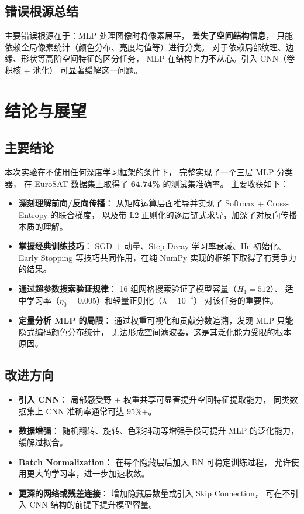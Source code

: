 \documentclass[12pt, a4paper]{article}
\begin{document}
\subsection{错误根源总结}

主要错误根源在于：MLP 处理图像时将像素展平，
\textbf{丢失了空间结构信息}，
只能依赖全局像素统计（颜色分布、亮度均值等）进行分类。
对于依赖局部纹理、边缘、形状等高阶空间特征的区分任务，
MLP 在结构上力不从心。引入 CNN（卷积核 + 池化）
可显著缓解这一问题。

\section{结论与展望}

\subsection{主要结论}

本次实验在不使用任何深度学习框架的条件下，
完整实现了一个三层 MLP 分类器，
在 EuroSAT 数据集上取得了 \textbf{64.74\%} 的测试集准确率。
主要收获如下：

\begin{itemize}[leftmargin=2em]
  \item \textbf{深刻理解前向/反向传播}：
    从矩阵运算层面推导并实现了 Softmax + Cross-Entropy 的联合梯度，
    以及带 L2 正则化的逐层链式求导，加深了对反向传播本质的理解。
  \item \textbf{掌握经典训练技巧}：
    SGD + 动量、Step Decay 学习率衰减、He 初始化、Early Stopping
    等技巧共同作用，在纯 NumPy 实现的框架下取得了有竞争力的结果。
  \item \textbf{通过超参数搜索验证规律}：
    16 组网格搜索验证了模型容量（$H_1 = 512$）、
    适中学习率（$\eta_0 = 0.005$）和轻量正则化（$\lambda = 10^{-4}$）
    对该任务的重要性。
  \item \textbf{定量分析 MLP 的局限}：
    通过权重可视化和贡献分数追溯，发现 MLP 只能隐式编码颜色分布统计，
    无法形成空间滤波器，这是其泛化能力受限的根本原因。
\end{itemize}

\subsection{改进方向}

\begin{itemize}[leftmargin=2em]
  \item \textbf{引入 CNN}：
    局部感受野 + 权重共享可显著提升空间特征提取能力，
    同类数据集上 CNN 准确率通常可达 95\%+。
  \item \textbf{数据增强}：
    随机翻转、旋转、色彩抖动等增强手段可提升 MLP 的泛化能力，
    缓解过拟合。
  \item \textbf{Batch Normalization}：
    在每个隐藏层后加入 BN 可稳定训练过程，
    允许使用更大的学习率，进一步加速收敛。
  \item \textbf{更深的网络或残差连接}：
    增加隐藏层数量或引入 Skip Connection，
    可在不引入 CNN 结构的前提下提升模型容量。
\end{itemize}
\end{document}
